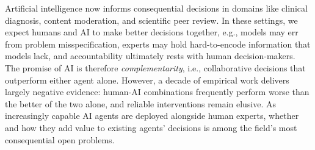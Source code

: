 


\setlength{\columnsep}{15pt}%
\setlength{\intextsep}{0pt plus 0pt minus 0pt}

\setlength{\parindent}{\myindent}
\setlength{\parskip}{\myparskip}

 \vspace*{-20pt}


Artificial intelligence now informs consequential decisions in domains like clinical diagnosis, content moderation, and scientific peer review.
In these settings, we expect humans and AI to make better decisions together, e.g., models may err from problem misspecification, experts may hold hard-to-encode information that models lack, and accountability ultimately rests with human decision-makers. 
The promise of AI is therefore \emph{complementarity}, i.e., collaborative decisions that outperform either agent alone.
However, a decade of empirical work delivers largely negative evidence: human-AI combinations frequently perform worse than the better of the two alone, and reliable interventions remain elusive.
As increasingly capable AI agents are deployed alongside human experts, whether and how they add value to existing agents' decisions is among the field's most consequential open problems.


